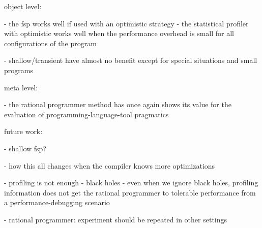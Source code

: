 

object level:

- the fsp works well if used with an optimistic strategy
- the statistical profiler with optimistic works well when the
    performance overhead is small for all configurations of the
    program

- shallow/transient have almost no benefit except for special
  situations and small programs 

meta level:

- the rational programmer method has once again shows its value for
  the evaluation of programming-language-tool pragmatics

future work:

- shallow fsp?

- how this all changes when the compiler knows more optimizations 

- profiling is not enough
  - black holes
  - even when we ignore black holes, profiling information does not
    get the rational programmer to tolerable performance from a
    performance-debugging scenario


- rational programmer: experiment should be repeated in other settings






